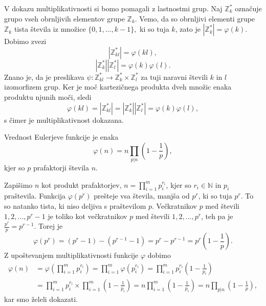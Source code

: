\documentclass[mat1]{fmfdelo}
\begin{document}
\begin{dokaz}
V dokazu multiplikativnosti si bomo pomagali z lastnostmi grup. 
Naj $\mathbb{Z}_{k}^\ast $ označuje grupo vseh obrnljivih elementov grupe $\mathbb{Z}_{k}$. Vemo, da so obrnljivi elementi grupe $\mathbb{Z}_{k}$ tista števila iz množice \( \{0, 1, \ldots, k-1 \}, \) ki so tuja $k$, zato je $|\mathbb{Z}_{k}^\ast| = \varphi(k).$  
Dobimo zvezi
\[ |\mathbb{Z}_{kl}^\ast| = \varphi(kl), \]
\[ |\mathbb{Z}_{k}^\ast| |\mathbb{Z}_{l}^\ast| = \varphi(k) \varphi(l).\]
Znano je, da je preslikava \( \psi \colon \mathbb{Z}_{kl}^\ast \rightarrow \mathbb{Z}_{k}^\ast \times \mathbb{Z}_{l}^\ast \) za tuji naravni števili $k$ in $l$ izomorfizem grup. Ker je moč kartezičnega produkta dveh množic enaka produktu njunih moči, sledi 
\[ \varphi(kl) = |\mathbb{Z}_{kl}^\ast| = |\mathbb{Z}_{k}^\ast| |\mathbb{Z}_{l}^\ast| = \varphi(k) \varphi(l), \]
s čimer je multiplikativnost dokazana.
\end{dokaz}

\begin{trditev}
\label{trd:EulerPrastProd}
Vrednost Eulerjeve funkcije je enaka
\[ \varphi(n) = n \prod_{p|n} \left (1 - \frac{1}{p} \right ), \] kjer so $p$ prafaktorji števila $n$.
\end{trditev}

\begin{dokaz}
Zapišimo $n$ kot produkt prafaktorjev, \(n=\prod_{i=1}^m p_i^{r_i}\), kjer so $r_i \in \mathbb{N}$ in $p_i$ praštevila.
Funkcija $\varphi(p^{r})$ prešteje vsa števila, manjša od $p^r$, ki so tuja $p^r$. To so natanko tista, ki niso deljiva s praštevilom $p$. Večkratnikov $p$ med števili $1, 2, \ldots, p^r-1$ je toliko kot večkratnikov $p$ med števili $1, 2, \ldots, p^r$, teh pa je \( \frac{p^r}{p} = p^{r-1}. \)
Torej je 
\[ \varphi(p^r) = (p^r - 1) - (p^{r-1} - 1) = p^r - p^{r-1} = p^r \left (1 - \frac{1}{p} \right). \] 
Z upoštevanjem multiplikativnosti funkcije $\varphi$ dobimo
%
\begin{align*}
 \varphi(n) 
 &= \varphi \left (\prod_{i=1}^m p_i^{r_i} \right ) = \prod_{i=1}^m \varphi (p_i^{r_i} ) = 
 \prod_{i=1}^m p_i^{r_i} \left (1 - \frac{1}{p_i} \right ) \\
 &= \prod_{i=1}^m p_i^{r_i} \times \prod_{i=1}^m \left (1 - \frac{1}{p_i} \right ) = 
 n \prod_{i=1}^m \left (1 - \frac{1}{p_i} \right ) = n \prod_{p|n} \left (1 - \frac{1}{p} \right ),
\end{align*}
kar smo želeli dokazati.
\end{dokaz}
%
\end{document}
